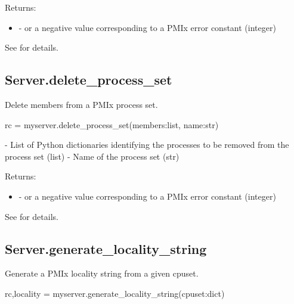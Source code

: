 Returns:

\begin{itemize}
    \item {} -  or a negative value corresponding to a PMIx error constant (integer)
\end{itemize}

See  for details.


\subsection{Server.delete_process_set}

\summary
Delete members from a \ac{PMIx} process set.

\format

\pyspecificstart
\begin{codepar}
rc = myserver.delete_process_set(members:list, name:str)
\end{codepar}
\pyspecificend


\begin{arglist}
 - List of Python  dictionaries identifying the processes to be removed from the process set (list)
 - Name of the process set (str)
\end{arglist}

Returns:

\begin{itemize}
    \item {} -  or a negative value corresponding to a PMIx error constant (integer)
\end{itemize}

See  for details.


\subsection{Server.generate_locality_string}

\summary
Generate a \ac{PMIx} locality string from a given cpuset.

\format

\pyspecificstart
\begin{codepar}
rc,locality = myserver.generate_locality_string(cpuset:dict)
\end{codepar}
\pyspecificend


